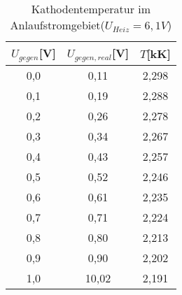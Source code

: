 \begin{table}[h]
	\begin{center}
		\begin{tabular}{ccc}
			$U_{gegen}$[V]&$U_{gegen,real}$[V]&$T$[kK] \\ \hline
			0,0&0,11&2,298\\
			0,1&0,19&2,288\\
			0,2&0,26&2,278\\
			0,3&0,34&2,267\\
			0,4&0,43&2,257\\
			0,5&0,52&2,246\\
			0,6&0,61&2,235\\
			0,7&0,71&2,224\\
			0,8&0,80&2,213\\
			0,9&0,90&2,202\\
			1,0&10,02&2,191
		\end{tabular}
		\caption{Kathodentemperatur im Anlaufstromgebiet($U_{Heiz}=6,1V$)}
		\label{tabc1}
	\end{center}
\end{table}